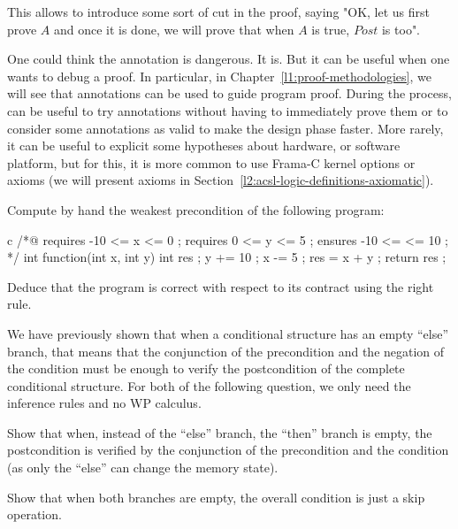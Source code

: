 This allows to introduce some sort of cut in the proof, saying "OK, let us first
prove $A$ and once it is done, we will prove that when $A$ is true, $Post$ is
too".


One could think the  annotation is dangerous. It is. But it
can be useful when one wants to debug a proof. In particular, in
Chapter~\ref{l1:proof-methodologies}, we will see that 
annotations can be used to guide program proof. During the process,
 can be useful to try annotations without having to
immediately prove them or to consider some annotations as valid to make the
design phase faster. More rarely, it can be useful to explicit some hypotheses
about hardware, or software platform, but for this, it is more common to use
Frama-C kernel options or axioms (we will present axioms in
Section~\ref{l2:acsl-logic-definitions-axiomatic}).







Compute by hand the weakest precondition of the following program:


\begin{CodeBlock}{c}
/*@
  requires -10 <= x <= 0 ;
  requires 0 <= y <= 5 ;
  ensures -10 <= \result <= 10 ;
*/
int function(int x, int y){
  int res ;
  y += 10 ;
  x -= 5 ;
  res = x + y ;
  return res ;
}
\end{CodeBlock}


Deduce that the program is correct with respect to its contract using the
right rule.




We have previously shown that when a conditional structure has an empty ``else''
branch, that means that the conjunction of the precondition and the negation
of the condition must be enough to verify the postcondition of the complete
conditional structure.
For both of the following question, we only need the inference rules and
no WP calculus.

Show that when, instead of the ``else'' branch, the ``then'' branch is empty,
the postcondition is verified by the conjunction of the precondition and
the condition (as only the ``else'' can change the memory state).

Show that when both branches are empty, the overall condition is just a
skip operation.




